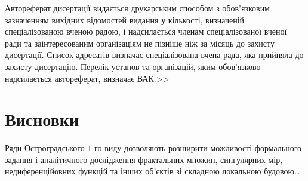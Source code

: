\documentclass[
]{mon2017dev-aref}[2019/11/16]
\theoremstyle{plain}
\theoremstyle{definition}
\theoremstyle{remark}
\begin{document}
Автореферат дисертації видається друкарським способом з
обов'язковим зазначенням вихідних відомостей видання у кількості,
визначеній спеціалізованою вченою радою, і надсилається членам
спеціалізованої вченої ради та заінтересованим організаціям не
пізніше ніж за місяць до захисту дисертації. Список адресатів
визначає спеціалізована вчена рада, яка прийняла до захисту
дисертацію. Перелік установ та організацій, яким обов'язково
надсилається автореферат, визначає ВАК.>>


\part{Висновки}

Ряди Остроградського $1$-го виду дозволяють розширити можливості
формального задання і аналітичного дослідження фрактальних множин,
сингулярних мір, недиференційовних функцій та інших об'єктів зі
складною локальною будовою\ldots



\makeatletter
\renewcommand\@biblabel[1]{#1.}
\makeatother



\begin{abstract}[
  language=ukrainian,%
  chapter=Анотації,  %
]
Дисертація присвячена дослідженню математичних об'єктів зі
\linebreak складною локальною будовою: фрактальних множин,
сингулярних мір, недиференційовних функцій, заданих у термінах
рядів Остроградського $1$-го виду. Досліджуються деякі класи
замкнених ніде не щільних множин, заданих умовами на елементи їх
розвинення в ряд Остроградського. Встановлено умови нуль-мірності
та додатності міри Лебега множин з цих класів. Проводиться
порівняння з відповідними твердженнями про міру Лебега множин
чисел, заданих умовами на елементи їх розвинення в ланцюговий
дріб. Вказано на принципові відмінності метричної теорії рядів
Остроградського та метричної теорії ланцюгових дробів. Також
вивчено тополого-метричні та фрактальні властивості множини
неповних сум та випадкової неповної суми ряду Остроградського 1-го
виду. Для випадкової величини з незалежними різницями елементів
ряду Остроградського знайдено критерій дискретності
(неперервності) розподілу та умови сингулярності канторівського
типу. Вивчено диференціальні та фрактальні властивості функції,
заданої перетворювачем елементів ряду Остроградського в двійкові
цифри.

\end{abstract}
\end{document}
